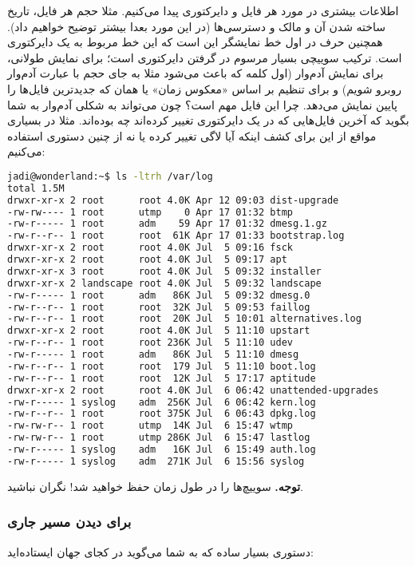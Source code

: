  اطلاعات بیشتری در مورد هر فایل و دایرکتوری پیدا می‌کنیم. مثلا حجم هر فایل، تاریخ ساخته شدن آن و مالک و دسترسی‌ها (در این مورد بعدا بیشتر توضیح خواهیم داد). همچنین حرف  در اول خط نمایشگر این است که این خط مربوط به یک دایرکتوری است. ترکیب سوییچی بسیار مرسوم در گرفتن دایرکتوری 
 است؛  برای نمایش طولانی،  برای نمایش آدم‌وار (اول کلمه 
 که باعث می‌شود مثلا به جای حجم 
 با عبارت آدم‌وار  روبرو شویم) و  برای تنظیم بر اساس «معکوس زمان» یا همان 
 که جدیدترین فایل‌ها را پایین نمایش می‌دهد. چرا این فایل مهم است؟ چون می‌تواند به شکلی آدم‌وار به شما بگوید که آخرین فایل‌هایی که در یک دایرکتوری تغییر کرده‌اند چه بوده‌اند. مثلا در بسیاری مواقع از این برای کشف اینکه آیا لاگی تغییر کرده یا نه از چنین دستوری استفاده می‌کنیم:

\begin{latin}
\begin{lstlisting}[language=bash,basicstyle=\ttfamily,linewidth=10cm]
jadi@wonderland:~$ ls -ltrh /var/log
total 1.5M
drwxr-xr-x 2 root      root 4.0K Apr 12 09:03 dist-upgrade
-rw-rw---- 1 root      utmp    0 Apr 17 01:32 btmp
-rw-r----- 1 root      adm    59 Apr 17 01:32 dmesg.1.gz
-rw-r--r-- 1 root      root  61K Apr 17 01:33 bootstrap.log
drwxr-xr-x 2 root      root 4.0K Jul  5 09:16 fsck
drwxr-xr-x 2 root      root 4.0K Jul  5 09:17 apt
drwxr-xr-x 3 root      root 4.0K Jul  5 09:32 installer
drwxr-xr-x 2 landscape root 4.0K Jul  5 09:32 landscape
-rw-r----- 1 root      adm   86K Jul  5 09:32 dmesg.0
-rw-r--r-- 1 root      root  32K Jul  5 09:53 faillog
-rw-r--r-- 1 root      root  20K Jul  5 10:01 alternatives.log
drwxr-xr-x 2 root      root 4.0K Jul  5 11:10 upstart
-rw-r--r-- 1 root      root 236K Jul  5 11:10 udev
-rw-r----- 1 root      adm   86K Jul  5 11:10 dmesg
-rw-r--r-- 1 root      root  179 Jul  5 11:10 boot.log
-rw-r--r-- 1 root      root  12K Jul  5 17:17 aptitude
drwxr-xr-x 2 root      root 4.0K Jul  6 06:42 unattended-upgrades
-rw-r----- 1 syslog    adm  256K Jul  6 06:42 kern.log
-rw-r--r-- 1 root      root 375K Jul  6 06:43 dpkg.log
-rw-rw-r-- 1 root      utmp  14K Jul  6 15:47 wtmp
-rw-rw-r-- 1 root      utmp 286K Jul  6 15:47 lastlog
-rw-r----- 1 syslog    adm   16K Jul  6 15:49 auth.log
-rw-r----- 1 syslog    adm  271K Jul  6 15:56 syslog
\end{lstlisting}
\end{latin}

\textbf{توجه.}
سوییچ‌ها را در طول زمان حفظ خواهید شد! نگران نباشید.
\subsubsection*{ برای دیدن مسیر جاری}
دستوری بسیار ساده که به شما می‌گوید در کجای جهان ایستاده‌اید:

